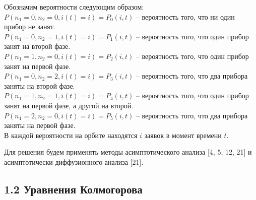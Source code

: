 Обозначим вероятности следующим образом:\\
$P(n_{1}=0,n_{2}=0,i(t)=i)=P_{0}(i, t)$ -- вероятность того, что ни один прибор не занят.\\
$P(n_{1}=0,n_{2}=1,i(t)=i)=P_{1}(i, t)$ -- вероятность того, что один прибор занят на второй фазе.\\
$P(n_{1}=1,n_{2}=0,i(t)=i)=P_{2}(i, t)$ -- вероятность того, что один прибор занят на первой фазе.\\
$P(n_{1}=0,n_{2}=2,i(t)=i)=P_{3}(i, t)$ -- вероятность того, что два прибора заняты на второй фазе.\\
$P(n_{1}=1,n_{2}=1,i(t)=i)=P_{4}(i, t)$ -- вероятность того, что один прибор занят на первой фазе, а другой на второй.\\
$P(n_{1}=2,n_{2}=0,i(t)=i)=P_{5}(i, t)$ -- вероятность того, что два прибора заняты на первой фазе.\\
В каждой вероятности на орбите находятся $i$ заявок в момент времени $t$.

Для решения будем применять методы асимптотического анализа [4, 5, 12, 21] и асимптотически диффузионного анализа [21].

\newpage

\subsection{1.2 Уравнения Колмогорова}


